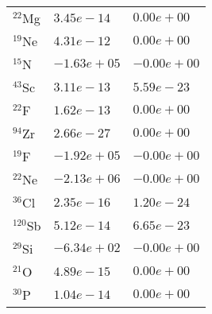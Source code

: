 \begin{tabular}{lll}
 $^{22}$Mg  & $3.45e-14 $                                                        & $0.00e+00 $                                                                     \\
 $^{19}$Ne  & $4.31e-12 $                                                        & $0.00e+00 $                                                                     \\
 $^{15}$N   & $-1.63e+05 $                                                       & $-0.00e+00 $                                                                    \\
 $^{43}$Sc  & $3.11e-13 $                                                        & $5.59e-23 $                                                                     \\
 $^{22}$F   & $1.62e-13 $                                                        & $0.00e+00 $                                                                     \\
 $^{94}$Zr  & $2.66e-27 $                                                        & $0.00e+00 $                                                                     \\
 $^{19}$F   & $-1.92e+05 $                                                       & $-0.00e+00 $                                                                    \\
 $^{22}$Ne  & $-2.13e+06 $                                                       & $-0.00e+00 $                                                                    \\
 $^{36}$Cl  & $2.35e-16 $                                                        & $1.20e-24 $                                                                     \\
 $^{120}$Sb & $5.12e-14 $                                                        & $6.65e-23 $                                                                     \\
 $^{29}$Si  & $-6.34e+02 $                                                       & $-0.00e+00 $                                                                    \\
 $^{21}$O   & $4.89e-15 $                                                        & $0.00e+00 $                                                                     \\
 $^{30}$P   & $1.04e-14 $                                                        & $0.00e+00 $                                                                     \\

\end{tabular}
